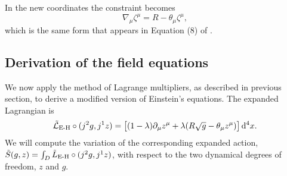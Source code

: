 \documentclass[../main.tex]{subfiles}
\begin{document}
In the new coordinates the constraint becomes
\begin{equation} \label{eq:constraint coordinates 2}
	\nabla_\mu \zeta^\mu = R - \theta_\mu \zeta^\mu,
\end{equation}
which is the same form that appears in Equation (8) of \cite{Lazo2017}. 

\subsection{Derivation of the field equations}
We now apply the method of Lagrange multipliers, as
described in previous section, to derive a modified version of Einstein's equations. The
expanded Lagrangian is
\begin{equation*}
\tilde{\mathcal{L}}_\text{E-H} \circ (j^2 g, j^1 z) = \big[(1-\lambda) \partial_\mu z^\mu + \lambda(R\sqrt{g} - \theta_\mu z^\mu)\big] \,\mathrm{d}^4
	x.
\end{equation*}
We will compute the variation of the corresponding expanded action, \(\Tilde{S}(g,z) = \int_D \Tilde{L}_\text{E-H} \circ (j^2g,j^1z)\), with respect to the two dynamical degrees of freedom, \(z\) and \(g\).
\end{document}
